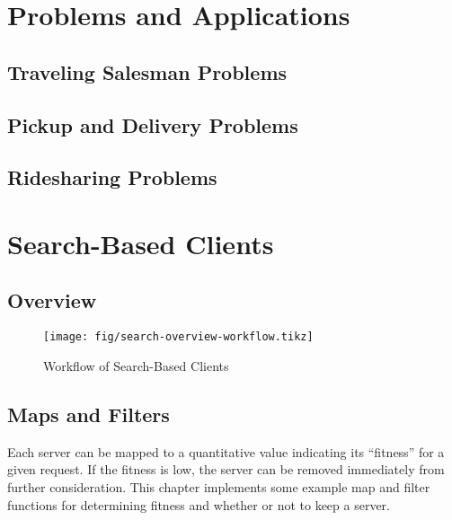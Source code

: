 \part{Problems and Applications}%
\label{part-problems}

\chapter{Traveling Salesman Problems}
\label{intro-tsp}

\chapter{Pickup and Delivery Problems}
\label{intro-pdp}

\nwenddocs{}\chapter{Ridesharing Problems}
\label{intro-rsp}

\nwenddocs{}\part{Search-Based Clients}
\label{part-search}

\chapter{Overview}
\label{search-overview}

\renewcommand{\thepage}{\arabic{page}}
\setcounter{page}{1}

\begin{figure}[h]
\centering
\texttt{[image: fig/search-overview-workflow.tikz]}
\caption{Workflow of Search-Based Clients}
\label{search-overview: fig-workflow}
\end{figure}

\nwenddocs{}\chapter{Maps and Filters}
\label{search-filters}

Each server can be mapped to a quantitative value indicating its ``fitness''
for a given request.  If the fitness is low, the server can be removed
immediately from further consideration. This chapter implements some example
map and filter functions for determining fitness and whether or not to keep a
server.

